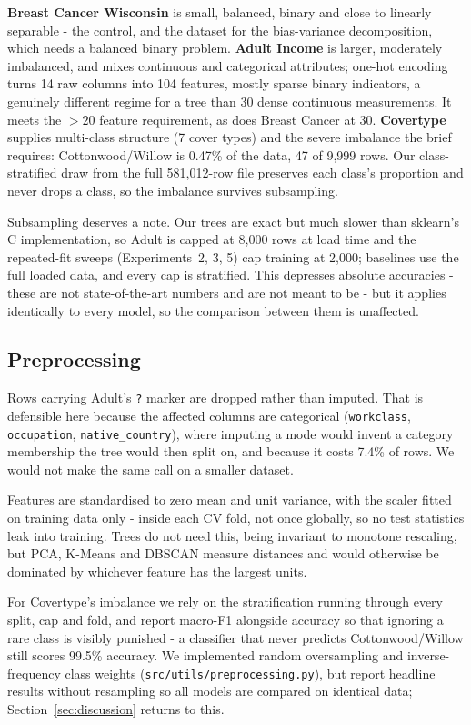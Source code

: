 \documentclass[conference]{IEEEtran}
\begin{document}
\textbf{Breast Cancer Wisconsin} is small, balanced, binary and close to
linearly separable - the control, and the dataset for the bias-variance
decomposition, which needs a balanced binary problem.
\textbf{Adult Income} is larger, moderately imbalanced, and mixes
continuous and categorical attributes; one-hot encoding turns 14 raw
columns into 104 features, mostly sparse binary indicators, a genuinely
different regime for a tree than 30 dense continuous measurements.  It
meets the $>20$ feature requirement, as does Breast Cancer at 30.
\textbf{Covertype} supplies multi-class structure (7 cover types) and the
severe imbalance the brief requires: Cottonwood/Willow is 0.47\% of the
data, 47 of 9{,}999 rows.  Our class-stratified draw from the full
581{,}012-row file preserves each class's proportion and never drops a
class, so the imbalance survives subsampling.

Subsampling deserves a note.  Our trees are exact but much slower than
sklearn's C implementation, so Adult is capped at 8{,}000 rows at load time
and the repeated-fit sweeps (Experiments~2, 3, 5) cap training at 2{,}000;
baselines use the full loaded data, and every cap is stratified.  This
depresses absolute accuracies - these are not state-of-the-art numbers
and are not meant to be - but it applies identically to every model, so
the comparison between them is unaffected.

\subsection{Preprocessing}
Rows carrying Adult's \texttt{?} marker are dropped rather than imputed.
That is defensible here because the affected columns are categorical
(\texttt{workclass}, \texttt{occupation}, \texttt{native\_country}), where
imputing a mode would invent a category membership the tree would then
split on, and because it costs 7.4\% of rows.  We would not make the same
call on a smaller dataset.

Features are standardised to zero mean and unit variance, with the scaler
fitted on training data only - inside each CV fold, not once globally, so
no test statistics leak into training.  Trees do not need this, being
invariant to monotone rescaling, but PCA, K-Means and DBSCAN measure
distances and would otherwise be dominated by whichever feature has the
largest units.

For Covertype's imbalance we rely on the stratification running through
every split, cap and fold, and report macro-F1 alongside accuracy so that
ignoring a rare class is visibly punished - a classifier that never
predicts Cottonwood/Willow still scores 99.5\% accuracy.  We implemented
random oversampling and inverse-frequency class weights
(\texttt{src/utils/preprocessing.py}), but report headline results without
resampling so all models are compared on identical data;
Section~\ref{sec:discussion} returns to this.
\end{document}
